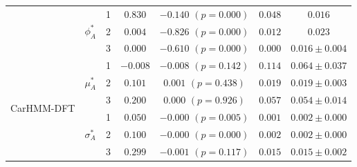 \documentclass{article}
\begin{document}
\begin{center}
{\begin{tabular}{ccccccc}
                            & \multirow{3}{*}{$\phi_A^*$}   & 1                                & $0.830$                         & $-0.140$ $(p=0.000)$          & $0.048$                             & $0.016  $                             \\
                            &                               & 2                                & $0.004$                         & $-0.826$ $(p=0.000)$          & $0.012$                             & $0.023  $                             \\
                            &                               & 3                                & $0.000$                         & $-0.610$ $(p=0.000)$          & $0.000$                             & $0.016 \pm 0.004$                             \\ \hline
\multirow{9}{*}{CarHMM-DFT} & \multirow{3}{*}{$\mu_A^*$}    & 1                                & $-0.008$                         & $-0.008$ $(p=0.142)$          & $0.114$                             & $0.064 \pm 0.037$                             \\
                            &                               & 2                                & $0.101$                         & $0.001$ $(p=0.438)$          & $0.019$                             & $0.019 \pm 0.003$                             \\
                            &                               & 3                                & $0.200$                         & $0.000$ $(p=0.926)$          & $0.057$                             & $0.054 \pm 0.014$                             \\
                            & \multirow{3}{*}{$\sigma_A^*$} & 1                                & $0.050$                         & $-0.000$ $(p=0.005)$          & $0.001$                             & $0.002 \pm 0.000$                             \\
                            &                               & 2                                & $0.100$                         & $-0.000$ $(p=0.000)$          & $0.002$                             & $0.002 \pm 0.000$                             \\ 
                            &                               & 3                                & $0.299$                         & $-0.001$ $(p=0.117)$          & $0.015$                             & $0.015 \pm 0.002$                             \\

\end{tabular}}
\end{center}
\end{document}
